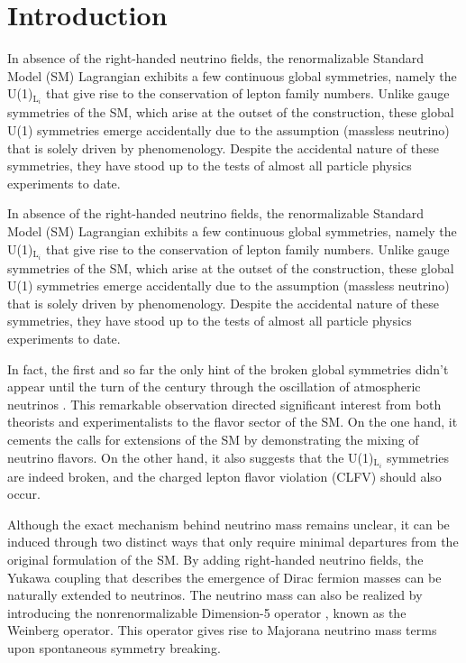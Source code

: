 \chapter{Introduction}
\label{chap:Introduction}

In absence of the right-handed neutrino fields, the renormalizable Standard Model (SM) Lagrangian exhibits a few continuous global symmetries, namely the U(1)$_{\text{L}_{i}}$ that give rise to the conservation of lepton family numbers. Unlike gauge symmetries of the SM, which arise at the outset of the construction, these global U(1) symmetries emerge accidentally due to the assumption (massless neutrino) that is solely driven by phenomenology. Despite the accidental nature of these symmetries, they have stood up to the tests of almost all particle physics experiments to date.  

In absence of the right-handed neutrino fields, the renormalizable Standard Model (SM) Lagrangian exhibits a few continuous global symmetries, namely the U(1)$_{\text{L}_{i}}$ that give rise to the conservation of lepton family numbers. Unlike gauge symmetries of the SM, which arise at the outset of the construction, these global U(1) symmetries emerge accidentally due to the assumption (massless neutrino) that is solely driven by phenomenology. Despite the accidental nature of these symmetries, they have stood up to the tests of almost all particle physics experiments to date.  

In fact, the first and so far the only hint of the broken global symmetries didn't appear until the turn of the century through the oscillation of atmospheric neutrinos \cite{Super-Kamiokande:1998kpq,SNO:2002tuh}. This remarkable observation directed significant interest from both theorists and experimentalists to the flavor sector of the SM. On the one hand, it cements the calls for extensions of the SM by demonstrating the mixing of neutrino flavors. On the other hand, it also suggests that the U(1)$_{\text{L}_{i}}$ symmetries are indeed broken, and the charged lepton flavor violation (CLFV) should also occur. 

Although the exact mechanism behind neutrino mass remains unclear, it can be induced through two distinct ways that only require minimal departures from the original formulation of the SM. By adding right-handed neutrino fields, the Yukawa coupling \cite{PhysRevLett.19.1264} that describes the emergence of Dirac fermion masses can be naturally extended to neutrinos. The neutrino mass can also be realized by introducing the nonrenormalizable Dimension-5 operator \cite{Weinberg:1979sa}, known as the Weinberg operator. This operator gives rise to Majorana neutrino mass terms upon spontaneous symmetry breaking. 

